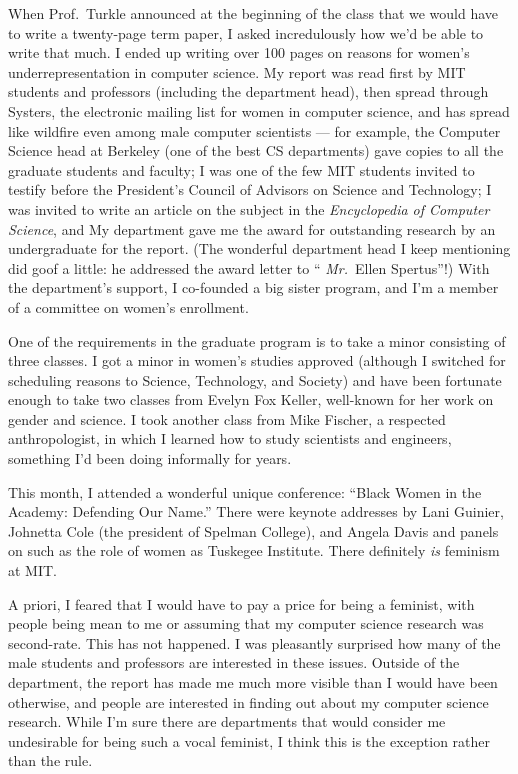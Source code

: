 When Prof.~Turkle announced at the beginning of the class that we
would have to write a twenty-page term paper, I asked incredulously
how we'd be able to write that much.  I ended up writing over 100
pages on reasons for women's underrepresentation in computer science.
My report was read first by MIT students and professors (including the
department head), then spread through Systers, the electronic mailing
list for women in computer science, and has spread like wildfire even
among male computer scientists --- for example, the Computer Science
head at Berkeley (one of the best CS departments) gave copies to all
the graduate students and faculty; I was one of the few MIT students
invited to testify before the President's Council of Advisors on
Science and Technology; I was invited to write an article on the
subject in the {\it Encyclopedia of Computer Science}, and My
department gave me the award for outstanding research by an
undergraduate for the report.  (The wonderful department head I keep
mentioning did goof a little: he addressed the award letter to ``{\it
Mr.}~Ellen Spertus''!)  With the department's support, I co-founded a
big sister program, and I'm a member of a committee on women's
enrollment.

One of the requirements in the graduate program is to take a minor
consisting of three classes.  I got a minor in women's studies
approved (although I switched for scheduling reasons to Science,
Technology, and Society) and have been fortunate enough to take two
classes from Evelyn Fox Keller, well-known for her work on gender and
science.  I took another class from Mike Fischer, a respected
anthropologist, in which I learned how to study scientists and
engineers, something I'd been doing informally for years.

This month, I attended a wonderful unique conference: ``Black Women in
the Academy: Defending Our Name.''  There were keynote addresses by
Lani Guinier, Johnetta Cole (the president of Spelman College), and
Angela Davis and panels on such as the role of women as Tuskegee
Institute.  There definitely {\it is\/} feminism at MIT.

A priori, I feared that I would have to pay a price for being a
feminist, with people being mean to me or assuming that my computer
science research was second-rate.  This has not happened.  I was
pleasantly surprised how many of the male students and professors are
interested in these issues.  Outside of the department, the report has
made me much more visible than I would have been otherwise, and people
are interested in finding out about my computer science research.
While I'm sure there are departments that would consider me
undesirable for being such a vocal feminist, I think this is the
exception rather than the rule.


